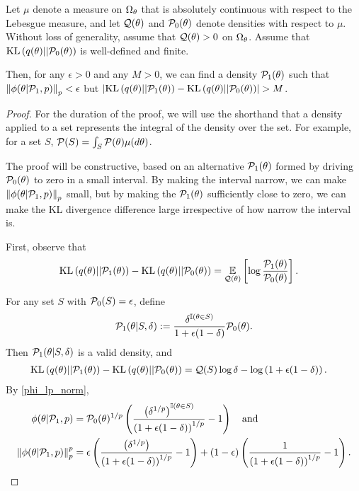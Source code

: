 \begin{thm}
%
Let $\mu$ denote a measure on $\Omega_{\theta}$ that is absolutely continuous
with respect to the Lebesgue measure, and let $\mathcal{Q}(\theta)$ and
$\mathcal{P}_{0}(\theta)$ denote densities with respect to $\mu$.  Without loss of
generality, assume that $\mathcal{Q}(\theta) > 0$ on $\Omega_{\theta}$.  Assume that
$\mathrm{KL}\left(q(\theta) || \mathcal{P}_{0}(\theta)\right)$ is well-defined and finite.

Then, for any $\epsilon > 0$ and any $M > 0$, we can find a density
$\mathcal{P}_{1}(\theta)$ such that $\left\Vert\phi(\theta \vert \mathcal{P}_{1}, p)\right\Vert_p < \epsilon$ but
$\left|\mathrm{KL}\left(q(\theta) || \mathcal{P}_{1}(\theta)\right) - \mathrm{KL}\left(q(\theta) || \mathcal{P}_{0}(\theta)\right)\right| > M$.

\begin{proof}
%
For the duration of the proof, we will use the shorthand that a density
applied to a set represents the integral of the density over the set.
For example, for a set $S$, $\mathcal{P}(S) = \int_S \mathcal{P}(\theta)\mu(d\theta)$.

The proof will be constructive, based on an alternative $\mathcal{P}_{1}(\theta)$ formed
by driving $\mathcal{P}_{0}(\theta)$ to zero in a small interval.  By making the interval
narrow, we can make $\left\Vert\phi(\theta \vert \mathcal{P}_{1}, p)\right\Vert_p$ small, but by making
the $\mathcal{P}_{1}(\theta)$ sufficiently close to zero, we can make the KL divergence
difference large irrespective of how narrow the interval is.

First, observe that
%
\begin{align*}
%
\KL{q(\theta) || \palt(\theta)} -
\KL{q(\theta) || \pbase(\theta)} ={}&
\expect{\q(\theta)}{\log \frac{\palt(\theta)}{\pbase(\theta)}}.
%
\end{align*}

For any set $S$ with $\mathcal{P}_{0}(S) = \epsilon$, define
%
\begin{align*}
%
\palt(\theta \vert S, \delta) :=
    \frac{\delta^{\ind{\theta \in S}}}{1 + \epsilon(1 - \delta)} \pbase(\theta).
%
\end{align*}
%
Then $\mathcal{P}_{1}(\theta \vert S, \delta)$ is a valid density, and
%
\begin{align*}
%
\KL{q(\theta) || \palt(\theta)} - \KL{q(\theta) || \pbase(\theta)}
    ={}& \q(S) \log \delta - \log\left( 1 + \epsilon(1 - \delta) \right).
%
\end{align*}
%
By \eqref{phi_lp_norm},
%
\begin{align*}
%
\phi(\theta \vert \palt, p) ={}&
    \pbase(\theta)^{1/p} \left(
        \frac{\left(\delta^{1/p}\right)^{\ind{\theta \in S}}}
             {\left( 1 + \epsilon(1 - \delta) \right)^{1/p}} - 1 \right) \mathand\\
\norm{\phi(\theta \vert \palt, p)}_p^p ={}&
\epsilon \left(
   \frac{\left(\delta^{1/p}\right)}
        {\left( 1 + \epsilon(1 - \delta) \right)^{1/p}} - 1 \right) +
(1 - \epsilon) \left(
   \frac{1}
        {\left( 1 + \epsilon(1 - \delta) \right)^{1/p}} - 1 \right).
%
\end{align*}


\end{proof}
\end{thm}
